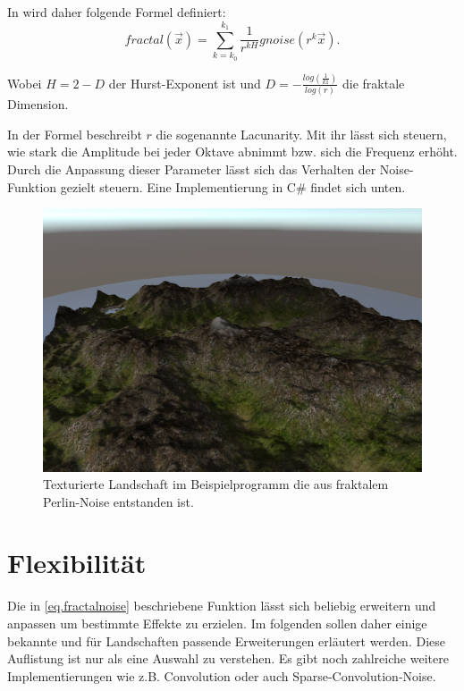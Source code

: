 In \cite{Saupe} wird daher folgende Formel definiert:
\begin{equation} \label{eq.fractalnoise}
	fractal(\vec{x}) = \sum_{k=k_0}^{k_1}\frac{1}{r^{kH}}gnoise(r^k\vec{x}).
\end{equation}

Wobei $H=2-D$ der Hurst-Exponent ist\cite{tuMuenchen} und %
$D=-\frac{log(\frac{1}{k1})}{log(r)}$\cite{fraktDim} die fraktale Dimension.

In der Formel beschreibt $r$ die sogenannte Lacunarity. Mit ihr lässt sich steuern, wie stark die Amplitude bei jeder Oktave abnimmt bzw. sich die Frequenz erhöht.
Durch die Anpassung dieser Parameter lässt sich das Verhalten der Noise-Funktion gezielt steuern. Eine Implementierung in C\# findet sich unten.

\begin{figure}
	\centering
	\includegraphics[width=\textwidth]{images/perlin_rendered.png}
	\caption{Texturierte Landschaft im Beispielprogramm die aus fraktalem Perlin-Noise entstanden ist.}\label{img.perlinRendered}
\end{figure}



\section{Flexibilität}\label{NoiseVariationen}
Die in \ref{eq.fractalnoise} beschriebene Funktion lässt sich beliebig erweitern und anpassen um bestimmte Effekte zu erzielen. Im folgenden sollen daher einige bekannte und für Landschaften passende Erweiterungen erläutert werden. Diese Auflistung ist nur als eine Auswahl zu verstehen. Es gibt noch zahlreiche weitere Implementierungen wie z.B. Convolution oder auch Sparse-Convolution-Noise\cite{texturingAndModeling}.

